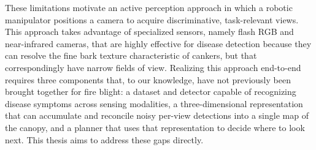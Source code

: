 

These limitations motivate an active perception approach in which a robotic
manipulator positions a camera to acquire discriminative, task-relevant views.
This approach takes advantage of specialized sensors, namely flash RGB and
near-infrared cameras, that are highly effective for disease detection because
they can resolve the fine bark texture characteristic of cankers, but that
correspondingly have narrow fields of view.
Realizing this approach end-to-end requires three components that, to our
knowledge, have not previously been brought together for fire blight: a
dataset and detector capable of recognizing disease symptoms across sensing
modalities, a three-dimensional representation that can accumulate and
reconcile noisy per-view detections into a single map of the canopy, and a
planner that uses that representation to decide where to look next. This
thesis aims to address these gaps directly.

